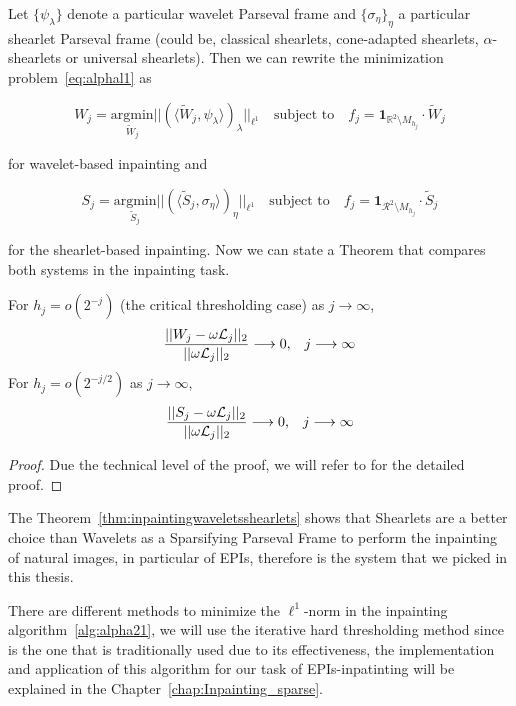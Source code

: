 Let $\{\psi_{\lambda}\}$ denote a particular wavelet Parseval frame and $\{ \sigma_{\eta}\}_{\eta}$ a particular shearlet Parseval frame (could be, classical shearlets, cone-adapted shearlets, $\alpha$-shearlets or universal shearlets). Then we can rewrite the minimization problem~\ref{eq:alphal1} as

$$
W_j=\underset{\tilde{W}_j}{\textrm{argmin}}||(\langle \tilde{W}_j,\psi_{\lambda}\rangle )_{\lambda}||_{\ell^1}\quad\textrm{subject to}\quad f_j=\mathbf{1}_{\mathbb{R}^2\setminus M_{h_j}}\cdot\tilde{W}_j
$$ 

for wavelet-based inpainting and 

$$
S_j=\underset{\tilde{S}_j}{\textrm{argmin}}||(\langle \tilde{S}_j,\sigma_{\eta}\rangle)_{\eta}||_{\ell^1}\quad \textrm{subject to}\quad f_j=\mathbf{1}_{\mathcal{R}^2\setminus M_{h_j}}\cdot\tilde{S}_j
$$

for the shearlet-based inpainting. Now we can state a Theorem that compares both systems in the inpainting task.

\begin{thm}
\label{thm:inpaintingwaveletsshearlets}
For $h_j=o(2^{-j})$ (the critical thresholding case) as $j\longrightarrow \infty$,
$$
\frac{||W_j-\omega\mathcal{L}_j||_2}{||\omega\mathcal{L}_j||_2}\longrightarrow 0\textrm{,}\quad j\longrightarrow \infty\\
$$ 
For $h_j=o(2^{-j/2})$ as $j\longrightarrow\infty$,
$$
\frac{||S_j-\omega\mathcal{L}_j||_2}{||\omega\mathcal{L}_j||_2}\longrightarrow 0\textrm{,}\quad j\longrightarrow\infty\\
$$
\end{thm}
\begin{proof}
Due the technical level of the proof, we will refer to \cite{clustered-inpainting} for the detailed proof. 
\end{proof}

The Theorem~\ref{thm:inpaintingwaveletsshearlets} shows that Shearlets are a better choice than Wavelets as a Sparsifying  Parseval Frame to perform the inpainting of natural images, in particular of EPIs, therefore is the system that we picked in this thesis.

\bigskip

There are different methods to minimize the $\ell^1$-norm in the inpainting algorithm~\ref{alg:alpha21}, we will use the iterative hard thresholding method since is the one that is traditionally used due to its effectiveness, the implementation and application of this algorithm for our task of EPIs-inpatinting will be explained in the Chapter~\ref{chap:Inpainting_sparse}.


